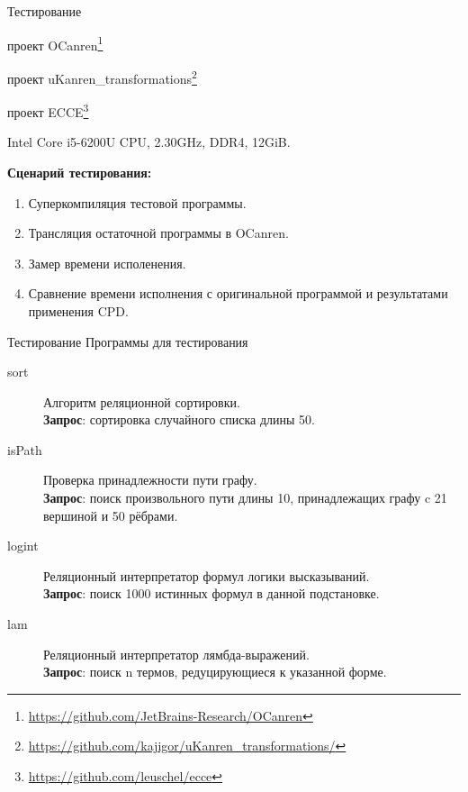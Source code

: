 \documentclass[xcolor=table]{beamer}
\begin{document}
%
\begin{frame}{Тестирование}

\begin{description}[leftmargin=!]
\item[Реализация miniKanren:] проект OCanren\footnote{\url{https://github.com/JetBrains-Research/OCanren}}\\
\item[Реализация CPD для miniKanren:] проект uKanren\_transformations\footnote{\url{https://github.com/kajigor/uKanren_transformations/}}
\item[Реализация CPD для Prolog:] проект ECCE\footnote{\url{https://github.com/leuschel/ecce}}
\item[Платформа:] Intel Core i5-6200U CPU, 2.30GHz, DDR4, 12GiB.
\end{description}
{\bf Сценарий тестирования:}
\begin{enumerate}
\item Суперкомпиляция тестовой программы.
\item Трансляция остаточной программы в OCanren.
\item Замер времени исполенения.
\item Сравнение времени исполнения с оригинальной программой и результатами
      применения CPD.
\end{enumerate}
\end{frame}
%
\begin{frame}{Тестирование}
{\small Программы для тестирования}
\begin{description}
\item[sort]Алгоритм реляционной сортировки.\\
      {\bf Запрос}: сортировка случайного списка длины 50.
\item[isPath] Проверка принадлежности пути графу.\\
      {\bf Запрос}: поиск  произвольного пути длины 10, принадлежащих графу c 21 вершиной и 50 рёбрами.
\item[logint] Реляционный интерпретатор формул логики высказываний.\\
      {\bf Запрос}: поиск 1000 истинных формул в данной подстановке.
\item[lam] Реляционный интерпретатор лямбда-выражений.\\
      {\bf Запрос}: поиск n термов, редуцирующиеся к указанной форме.
\end{description}
\end{frame}
\end{document}
